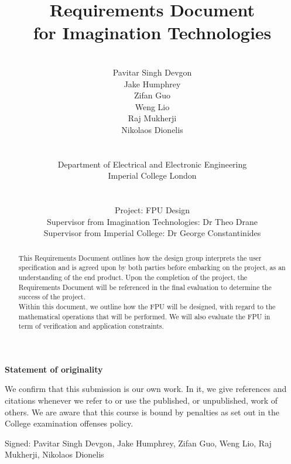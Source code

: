 \documentclass[11pt]{report}
\title{{\LARGE \textbf{Requirements Document}}\\ \Large\textbf{for Imagination Technologies}}
\author{
\\Pavitar Singh Devgon 
\\
Jake Humphrey
\\
Zifan Guo
\\
Weng Lio
\\
Raj Mukherji\\ 
Nikolaos Dionelis
\\
\\
\\
Department of Electrical and Electronic Engineering
\\
Imperial College London
\\
\\
\\
Project: FPU Design
\\
Supervisor from Imagination Technologies: Dr Theo Drane
\\
Supervisor from Imperial College: Dr George Constantinides
\\
}
\begin{document}

\maketitle
\vspace*{\fill}
\begin{center}
\LARGE \textbf{Statement of originality}
\end{center}

\begin{framed} 

\noindent
{\large We confirm that this submission is our own work. In it, we give references and citations whenever we refer to or use the published, or unpublished, work of others. We are aware that this course is bound by penalties as set out in the College examination offenses policy.}\\
\begin{center}

\vspace*{0.1in}
{\large Signed: Pavitar Singh Devgon, Jake Humphrey, Zifan Guo, Weng Lio, Raj Mukherji, Nikolaos Dionelis}

\end{center}
\end{framed}
\vspace*{\fill}

\begin{abstract}
This Requirements Document outlines how the design group interprets the user specification and is agreed upon by both parties before embarking on the project, as an understanding of the end product. Upon the completion of the project, the Requirements Document will be referenced in the final evaluation to determine the success of the project. \\

\noindent
Within this document, we outline how the FPU will be designed, with regard to the mathematical operations that will be performed. We will also evaluate the FPU in term of verification and application constraints.\\



\end{abstract}


\renewcommand*{\thesection}{\arabic{section}.}
\renewcommand{\thesubsection}{\thesection\arabic{subsection}}
\renewcommand{\thesubsubsection}{\thesubsection\arabic{subsubsection}}
\tableofcontents
\end{document}
